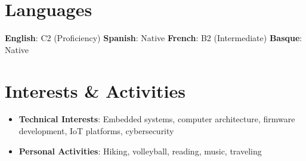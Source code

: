 \documentclass[letterpaper,11pt]{article}
\newcommand{\resumeSubHeadingListStart}{\begin{itemize}[leftmargin=*]}
\newcommand{\resumeSubHeadingListEnd}{\end{itemize}}
\begin{document}

\section{Languages}
    {\textbf{English}}{: C2 (Proficiency)}
    \hfill\textbf{Spanish}{: Native}
    \hfill\textbf{French}{: B2 (Intermediate)}
    \hfill\textbf{Basque}{: Native}



\section{Interests \& Activities}
\resumeSubHeadingListStart
  \item{
      \textbf{Technical Interests}{: Embedded systems, computer architecture, firmware development, IoT platforms, cybersecurity}
    }
  \item{
      \textbf{Personal Activities}{: Hiking, volleyball, reading, music, traveling}
    }
\resumeSubHeadingListEnd

\end{document}
